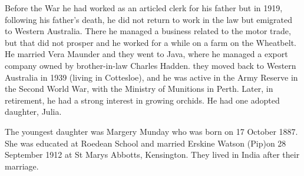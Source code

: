 Before the War he had worked as an articled clerk for his father but in 1919, following his father's death, he did not return to work in the law but emigrated to Western Australia.  There he managed a business related to the motor trade, but that did not prosper and he worked for a while on a farm on the Wheatbelt. He married Vera Maunder and they went to Java, where he managed a export company owned by brother-in-law Charles Hadden.  they moved back to Western Australia in 1939 (living in Cottesloe),  and he was active in the Army Reserve in the Second World War, with the Ministry of Munitions in Perth. Later, in retirement, he had a strong interest in growing orchids. He had one adopted daughter, Julia. 

The youngest daughter was Margery Munday who was born on 17 October 1887. She was educated at Roedean School
and married Erskine Watson (Pip)on 	28 September 1912 at St Marys Abbotts,	Kensington. They lived in India after their marriage.



